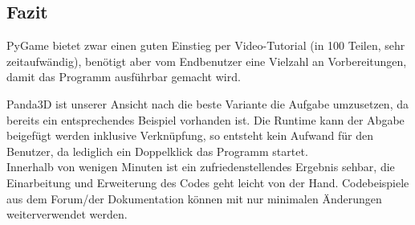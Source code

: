 \documentclass[12pt,a4paper,oneside,ngerman]{scrartcl}
\begin{document}
\subsection{Fazit}
PyGame bietet zwar einen guten Einstieg per Video-Tutorial (in 100 Teilen, sehr zeitaufwändig), benötigt aber vom Endbenutzer eine Vielzahl an Vorbereitungen, damit das Programm ausführbar gemacht wird.

Panda3D ist unserer Ansicht nach die beste Variante die Aufgabe umzusetzen, da bereits ein entsprechendes Beispiel vorhanden ist. Die Runtime kann der Abgabe beigefügt werden inklusive Verknüpfung, so entsteht kein Aufwand für den Benutzer, da lediglich ein Doppelklick das Programm startet. \\ 
Innerhalb von wenigen Minuten ist ein zufriedenstellendes Ergebnis sehbar, die Einarbeitung und Erweiterung des Codes geht leicht von der Hand. Codebeispiele aus dem Forum/der Dokumentation können mit nur minimalen Änderungen weiterverwendet werden.
\newpage
\end{document}
